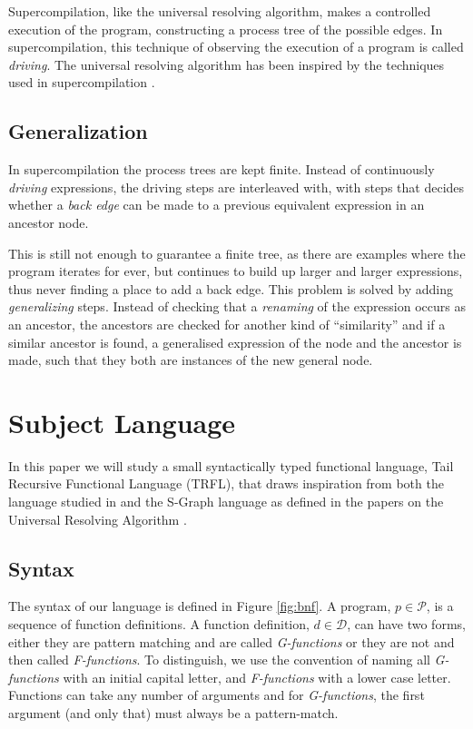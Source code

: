 \documentclass[10pt]{../sigplanconf}
\begin{document}
Supercompilation, like the universal resolving algorithm, makes a
controlled execution of the program, constructing a process tree of
the possible edges. In supercompilation, this technique of observing
the execution of a program is called \textit{driving}. The universal
resolving algorithm has been inspired by the techniques used in
supercompilation \cite{abramov2002principles}.

\subsection{Generalization}
In supercompilation the process trees are kept finite. Instead of
continuously \textit{driving} expressions, the driving steps are
interleaved with, with steps that decides whether a \textit{back edge}
can be made to a previous equivalent expression in an ancestor node.

This is still not enough to guarantee a finite tree, as there are
examples where the program iterates for ever, but continues to build
up larger and larger expressions, thus never finding a place to add a
back edge. This problem is solved by adding \textit{generalizing}
steps. Instead of checking that a \textit{renaming} of the expression
occurs as an ancestor, the ancestors are checked for another kind of
``similarity'' and if a similar ancestor is found, a generalised
expression of the node and the ancestor is made, such that they both
are instances of the new general node.

\section{Subject Language}
\label{sec:trfl}
In this paper we will study a small syntactically typed functional
language, Tail Recursive Functional Language (TRFL), that draws
inspiration from both the language studied in
\cite{sorensen1998introduction} and the S-Graph language as defined in
the papers on the Universal Resolving Algorithm
\cite{abramov2000universal, abramov2002universal,
  abramov2002principles}.

\subsection{Syntax}
The syntax of our language is defined in Figure \ref{fig:bnf}. A
program, $p \in \mathcal{P}$, is a sequence of function definitions. A
function definition, $d \in \mathcal{D}$, can have two forms, either
they are pattern matching and are called \textit{G-functions} or they
are not and then called \textit{F-functions}. To distinguish, we use
the convention of naming all \textit{G-functions} with an initial
capital letter, and \textit{F-functions} with a lower case
letter. Functions can take any number of arguments and for
\textit{G-functions}, the first argument (and only that) must always
be a pattern-match.
\end{document}
